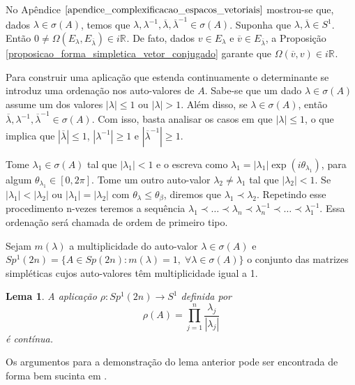 \documentclass[12pt]{book}
\newtheorem{lema}[teorema]{Lema}
\newcommand{\circulo}{S^{1}}
\newcommand{\espectrooperador}[1]{\sigma(#1)}
\newcommand{\formaSimpleticaExtendida}[2]{\Omega(#1, #2)}
\newcommand{\gruposimpletico}[1]{Sp(#1)}
\newcommand{\gruposimpleticoespecial}[1]{Sp^{1}(#1)}
\newcommand{\real}[1]{\mathbb{R}^{#1}}
\newcommand{\reta}{\real{}}
\begin{document}
	No Apêndice $\ref{apendice_complexificacao_espacos_vetoriais}$ mostrou-se que, dados $\lambda \in \sigma(A)$, temos que $\lambda, \lambda^{-1}, \overline{\lambda}, \overline{\lambda}^{-1}  \in \sigma(A)$. Suponha que $\lambda, \overline{\lambda} \in \circulo$. Então $0 \neq \formaSimpleticaExtendida{E_{\lambda}}{E_{\overline{\lambda}}} \in i\reta$. De fato, dados $v \in E_{\lambda}$ e $\overline{v} \in E_{\overline{\lambda}}$, a Proposição \ref{proposicao_forma_simpletica_vetor_conjugado} garante que  $\formaSimpleticaExtendida{\overline{v}}{v} \in i\reta$.
	
	Para construir uma aplicação que estenda continuamente o determinante se introduz uma ordenação nos auto-valores de $A$. Sabe-se que um dado $\lambda \in \espectrooperador{A}$ assume um dos valores $|\lambda|\leq 1$ ou $|\lambda|>1$. Além disso, se $\lambda \in \espectrooperador{A}$, então $\overline{\lambda}, \lambda^{-1}, \overline{\lambda}^{-1} \in \espectrooperador{A}$. Com isso, basta analisar os casos em que $|\lambda| \leq 1$, o que implica que $|\overline{\lambda}|\leq 1$, $|\lambda^{-1}|\geq 1$ e $|\overline{\lambda}^{-1}|\geq 1$.
	
	Tome $\lambda_{1}\in \sigma(A)$ tal que $|\lambda_{1}|<1$ e o escreva como $\lambda_{1} = |\lambda_{1}|\exp(i\theta_{\lambda_{1}})$, para algum $\theta_{\lambda_{1}} \in [0,2\pi]$. Tome um outro auto-valor $\lambda_{2}\neq \lambda_{1}$ tal que $|\lambda_{2}|<1$. Se $|\lambda_{1}| < |\lambda_{2}|$ ou  $|\lambda_{1}|= |\lambda_{2}|$ com $\theta_{\lambda} \leq \theta_{\beta}$, diremos que $\lambda_{1} \prec \lambda_{2}$. Repetindo esse procedimento n-vezes teremos a sequência $\lambda_{1} \prec \dots \prec \lambda_{n} \prec  \lambda_{n}^{-1} \prec \dots \prec \lambda_{1}^{-1}$. Essa ordenação será chamada de ordem de primeiro tipo.
	
	Sejam $m(\lambda)$ a multiplicidade do auto-valor $\lambda \in \espectrooperador{A}$  e $\gruposimpleticoespecial{2n} =\{A\in \gruposimpletico{2n} : m(\lambda) = 1,\;\forall \lambda\in \sigma(A) \}$ o conjunto das matrizes simpléticas cujos auto-valores têm multiplicidade igual a 1.
	
	\begin{lema}\label{lema_aplicacao_rho}
		A aplicação $\rho:\gruposimpleticoespecial{2n} \to \circulo$ definida por 
		$$
		\rho(A) = \prod_{j=1}^{n}\frac{\lambda_{j}}{|\lambda_{j}|}
		$$
		é contínua.
	\end{lema}
	
	Os argumentos para a demonstração do lema anterior pode ser encontrada de forma bem sucinta em \cite{salamon_zehnder}.
	
\end{document}
